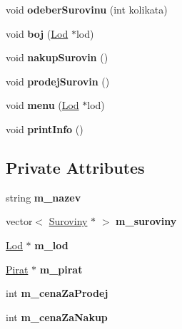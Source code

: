 \begin{DoxyCompactItemize}
\item 
\mbox{\label{class_planeta_a394655c56d2ba72fdab3720f23e2f31f}} 
void {\bfseries odeber\+Surovinu} (int kolikata)
\item 
\mbox{\label{class_planeta_a32fb35d5ecc6e98538fd616c7f9dc033}} 
void {\bfseries boj} (\hyperlink{class_lod}{Lod} $\ast$lod)
\item 
\mbox{\label{class_planeta_aded4c9c54fa3266417d3852e435b6464}} 
void {\bfseries nakup\+Surovin} ()
\item 
\mbox{\label{class_planeta_ad4b9d4c317d4d984f4bd416a3aea22b6}} 
void {\bfseries prodej\+Surovin} ()
\item 
\mbox{\label{class_planeta_a05fd163f88a54307ed6ef5345b24f85a}} 
void {\bfseries menu} (\hyperlink{class_lod}{Lod} $\ast$lod)
\item 
\mbox{\label{class_planeta_aa05930623310c5dfbb5169df606ecae0}} 
void {\bfseries print\+Info} ()
\end{DoxyCompactItemize}
\subsection*{Private Attributes}
\begin{DoxyCompactItemize}
\item 
\mbox{\label{class_planeta_a010a965fab8260a481619bf8a20f5fc5}} 
string {\bfseries m\+\_\+nazev}
\item 
\mbox{\label{class_planeta_a0f1ea1020c9c9c28b2a42a8fce3324c3}} 
vector$<$ \hyperlink{class_suroviny}{Suroviny} $\ast$ $>$ {\bfseries m\+\_\+suroviny}
\item 
\mbox{\label{class_planeta_a0165a95c2b317ab6679b4674995e5e62}} 
\hyperlink{class_lod}{Lod} $\ast$ {\bfseries m\+\_\+lod}
\item 
\mbox{\label{class_planeta_a3ba0f98683d50d0a254dccf2f0005d4f}} 
\hyperlink{class_pirat}{Pirat} $\ast$ {\bfseries m\+\_\+pirat}
\item 
\mbox{\label{class_planeta_a1167f2e3f48dc202575623da6862de95}} 
int {\bfseries m\+\_\+cena\+Za\+Prodej}
\item 
\mbox{\label{class_planeta_a0f305cffd46d4c9a441959942b439af5}} 
int {\bfseries m\+\_\+cena\+Za\+Nakup}
\end{DoxyCompactItemize}


